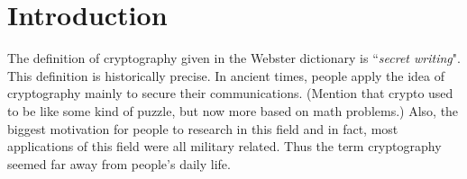 \chapter{Introduction}
The definition of cryptography given in the Webster dictionary is ``\textit{secret writing}". This definition is historically precise. In ancient times, people apply the idea of cryptography mainly to secure their communications. (Mention that crypto used to be like some kind of puzzle, but now more based on math problems.) Also, the biggest motivation for people to research in this field and in fact, most applications of this field were all military related. Thus the term cryptography seemed far away from people's daily life. 
